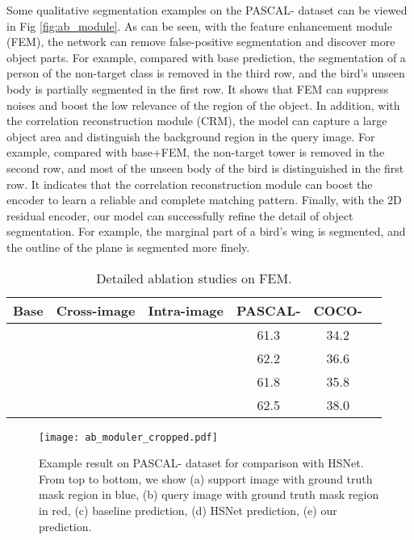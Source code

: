 \documentclass[journal]{IEEEtran}
\begin{document}
Some qualitative segmentation examples on the PASCAL- dataset can be viewed in Fig \ref{fig:ab_module}. As can be seen, with the feature enhancement module (FEM), the network can remove false-positive segmentation and discover more object parts. For example, compared with base prediction, the segmentation of a person of the non-target class is removed in the third row, and the bird's unseen body is partially segmented in the first row. It shows that FEM can suppress noises and boost the low relevance of the region of the object. In addition, with the correlation reconstruction module (CRM), the model can capture a large object area and distinguish the background region in the query image. For example, compared with base+FEM, the non-target tower is removed in the second row, and most of the unseen body of the bird is distinguished in the first row. It indicates that the correlation reconstruction module can boost the encoder to learn a reliable and complete matching pattern. Finally, with the 2D residual encoder, our model can successfully refine the detail of object segmentation. For example, the marginal part of a bird's wing is segmented, and the outline of the plane is segmented more finely.

\begin{table}[tb]
	\renewcommand\arraystretch{1.15}
	\setlength{\tabcolsep}{1.5mm}
	\caption{Detailed ablation studies on FEM.}
	\label{table:ab_module_fem}
	\begin{center}
		\begin{tabular}{cccccc}
			\hline
			\textbf{Base} & \textbf{Cross-image} & \textbf{Intra-image} & \textbf{PASCAL-} &  {\textbf{COCO-}}\\
			\hline
			  &    &         & 61.3   &  {34.2 }   \\
			  &         &    & 62.2   &  {36.6 }    \\
			&      &    & 61.8 &  {35.8}\\
			 &      &          &  62.5  &   {38.0}\\
			
			
			\hline
		\end{tabular}
	\end{center}
\end{table}


\begin{figure*}
	\centering
	\texttt{[image:  ab\_moduler\_cropped.pdf]}
	\caption{Example result on PASCAL- dataset for comparison with HSNet. From top to bottom, we show (a) support image with ground truth mask region in blue, (b) query image with ground truth mask region in red, (c) baseline prediction, (d) HSNet prediction, (e) our prediction.}
	\label{fig:ab_model}
\end{figure*}
\end{document}
